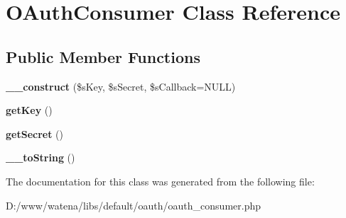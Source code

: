 \hypertarget{class_o_auth_consumer}{\section{O\-Auth\-Consumer Class Reference}
\label{class_o_auth_consumer}
}
\subsection*{Public Member Functions}
\begin{DoxyCompactItemize}
\item 
\hypertarget{class_o_auth_consumer_a45adbb581b321f8983d1363e6fcb494d}{{\bfseries \-\_\-\-\_\-construct} (\$s\-Key, \$s\-Secret, \$s\-Callback=N\-U\-L\-L)}\label{class_o_auth_consumer_a45adbb581b321f8983d1363e6fcb494d}

\item 
\hypertarget{class_o_auth_consumer_a25288931f4ed78d7929ad5739490188f}{{\bfseries get\-Key} ()}\label{class_o_auth_consumer_a25288931f4ed78d7929ad5739490188f}

\item 
\hypertarget{class_o_auth_consumer_ae8fca61f7c5c59358506c87cb63e7301}{{\bfseries get\-Secret} ()}\label{class_o_auth_consumer_ae8fca61f7c5c59358506c87cb63e7301}

\item 
\hypertarget{class_o_auth_consumer_a89846d5a5e0f7558a61919a8fc50bc12}{{\bfseries \-\_\-\-\_\-to\-String} ()}\label{class_o_auth_consumer_a89846d5a5e0f7558a61919a8fc50bc12}

\end{DoxyCompactItemize}


The documentation for this class was generated from the following file\-:\begin{DoxyCompactItemize}
\item 
D\-:/www/watena/libs/default/oauth/oauth\-\_\-consumer.\-php\end{DoxyCompactItemize}
